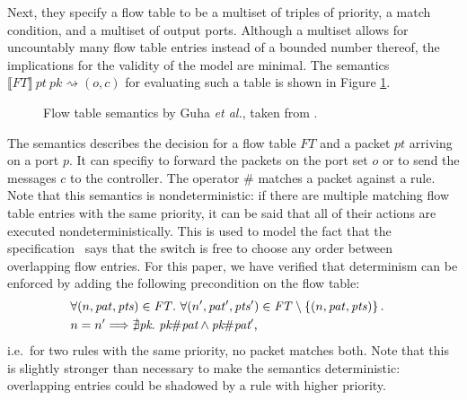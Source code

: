 Next, they specify a flow table to be a multiset of triples of priority, a match condition, and a multiset of output ports.
Although a multiset allows for uncountably many flow table entries instead of a bounded number thereof, the implications for the validity of the model are minimal.
The semantics $\llbracket \mathit{FT} \rrbracket~\mathit{pt}~\mathit{pk} \rightsquigarrow (o,c)$  for evaluating such a table is shown in Figure \ref{fig:guhafts}.
\begin{figure}
	\centering
	\caption{Flow table semantics by Guha \emph{et al.}, taken from \cite{guha2013machine}.}
	\label{fig:guhafts}
\end{figure}
The semantics describes the decision for a flow table $\mathit{FT}$ and a packet $pt$ arriving on a port $p$.
It can specifiy to forward the packets on the port set $o$ or to send the messages $c$ to the controller.
The operator $\#$ matches a packet against a rule.
Note that this semantics is nondeterministic:
	if there are multiple matching flow table entries with the same priority, it can be said that all of their actions are executed nondeterministically.
This is used to model the fact that the specification~\cite[§3.4]{specification10} says that the switch is free to choose any order between overlapping flow entries.
For this paper, we have verified that determinism can be enforced by adding the following precondition on the flow table:
\begin{align}
	&\forall\!\left(n,\mathit{pat},\mathit{pts}\right) \in \mathit{FT}.~\forall\!\left(n',\mathit{pat}',\mathit{pts}'\right) \in \mathit{FT} \setminus \left\{\left(n,\mathit{pat},\mathit{pts}\right) \right\}.& \nonumber\\
	&n = n' \Longrightarrow \nexists \emph{pk}.~\emph{pk}\#\emph{pat} \wedge \emph{pk}\#\emph{pat}'\text{,}&
\end{align}
i.e.\ for two rules with the same priority, no packet matches both. Note that this is slightly stronger than necessary to make the semantics deterministic: overlapping entries could be shadowed by a rule with higher priority.

